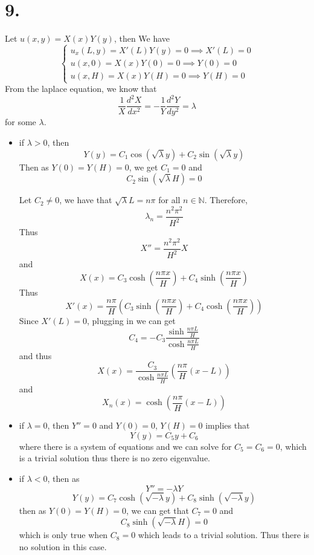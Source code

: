 \documentclass[11pt]{article}
\theoremstyle{mystyle}
\theoremstyle{definition}
\begin{document}
\section*{9.}
Let $u(x,y) = X(x)Y(y)$, then 
We have
\[
  \begin{cases}
    u_x(L,y) = X'(L) Y(y) = 0 \implies X'(L) = 0 \\
    u(x,0) = X(x) Y(0) = 0 \implies Y(0) = 0 \\ 
    u(x,H) = X(x) Y(H) = 0 \implies Y(H) = 0 
  \end{cases}
\]
From the laplace equation, we know that 
\[
  \displaystyle\frac{1}{X} \displaystyle\frac{d^2X}{dx^2} = - \displaystyle\frac{1}{Y} \displaystyle\frac{d^2Y}{dy^2} = \lambda
\]
for some $\lambda$. 
\begin{itemize}
  \item if $\lambda > 0$, then 
    \[
      Y(y) = C_1 \cos(\sqrt{\lambda}y) + C_2 \sin(\sqrt{\lambda}y)
    \]
    Then as $Y(0) = Y(H) = 0$, we get $C_1 = 0$ and  
    \[
      C_2 \sin(\sqrt{\lambda}H) = 0
    \]
    
    Let $C_2 \ne 0$, we have that 
    $\sqrt{\lambda} L = n\pi$ for all $n \in \mathbb{N}$. Therefore, 
    \[
      \lambda_n = \displaystyle\frac{n^2\pi^2}{H^2}
    \]
    Thus 
    \[
      X'' = \displaystyle\frac{n^2\pi^2}{H^2}X
    \]
    and 
    \[
      X(x) = C_3 \cosh \left( \displaystyle\frac{n\pi x}{H}\right) + C_4 \sinh \left(\displaystyle\frac{n\pi x}{H} \right)
    \]
    Thus 
    \[
      X'(x) = \displaystyle\frac{n\pi}{H} \left(C_3 \sinh \left( \displaystyle\frac{n\pi x}{H}\right) + C_4 \cosh \left(\displaystyle\frac{n\pi x}{H} \right)\right)
    \]
    Since $X'(L) = 0$, plugging in we can get 
    \[
      C_4 = -C_3 \displaystyle\frac{\sinh \displaystyle\frac{n\pi L}{H}}{\cosh \displaystyle\frac{n\pi L}{H}}
    \]
    and thus 
    \[
      X(x) = \displaystyle\frac{C_3}{\cosh \displaystyle\frac{n\pi L}{H}} \left( \displaystyle\frac{n\pi}{H}(x-L)\right)
    \]
    and 
    \[
      X_n(x) = \cosh \left( \displaystyle\frac{n\pi}{H}(x-L)\right)
    \]
  \item if $\lambda = 0$, then 
    $Y'' = 0$ and $Y(0) = 0$, $Y(H) = 0$ implies that 
    \[
      Y(y) = C_5y + C_6
    \]
    where there is a system of equations and we can solve for $C_5 = C_6 = 0$, which is a trivial solution thus there is no zero eigenvalue. 
  \item if $\lambda < 0$, then as 
    \[
      Y'' = -\lambda Y
    \]
    \[
      Y(y) = C_7 \cosh(\sqrt{-\lambda}y) + C_8 \sinh(\sqrt{-\lambda}y)
    \]
    then as $Y(0) = Y(H) = 0$, we can get that $C_7 = 0$ and 
    \[
      C_8 \sinh(\sqrt{-\lambda}H) = 0
    \]
    which is only true when $C_8 = 0$ which leads to a trivial solution. Thus there is no solution in this case. 
\end{itemize}
\end{document}

